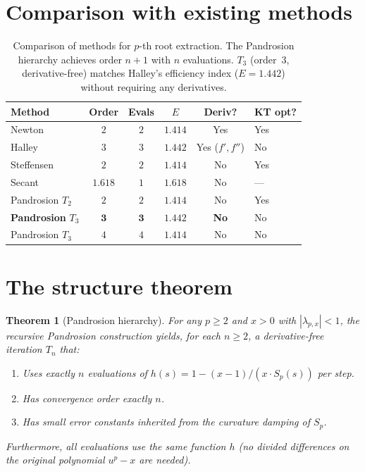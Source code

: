\documentclass[10pt,a4paper,oneside]{book}
\newtheorem{theorem}{Theorem}[chapter]
\theoremstyle{definition}
\theoremstyle{remark}
\begin{document}
\section{Comparison with existing methods}
\label{sec:comparison}

\begin{table}[H]
\centering
\renewcommand{\arraystretch}{1.2}
\begin{tabular}{lccccl}
\toprule
\textbf{Method} & \textbf{Order} & \textbf{Evals} & $E$ & \textbf{Deriv?} & \textbf{KT opt?} \\
\midrule
Newton & $2$ & $2$ & $1.414$ & Yes & Yes \\
Halley & $3$ & $3$ & $1.442$ & Yes ($f',f''$) & No \\
Steffensen & $2$ & $2$ & $1.414$ & No & Yes \\
Secant & $1.618$ & $1$ & $1.618$ & No & --- \\
\midrule
Pandrosion $T_2$ & $2$ & $2$ & $1.414$ & No & Yes \\
\textbf{Pandrosion} $T_3$ & $\mathbf{3}$ & $\mathbf{3}$ & $\mathbf{1.442}$ & \textbf{No} & No \\
Pandrosion $T_3$ & $4$ & $4$ & $1.414$ & No & No \\
\bottomrule
\end{tabular}
\caption{Comparison of methods for $p$-th root extraction.  The Pandrosion hierarchy achieves order $n+1$ with $n$ evaluations.  $T_3$ (order~$3$, derivative-free) matches Halley's efficiency index ($E = 1.442$) without requiring any derivatives.}
\label{tab:comparison}
\end{table}

\section{The structure theorem}
\label{sec:structure}

\begin{theorem}[Pandrosion hierarchy]
\label{thm:hierarchy}
For any $p \geq 2$ and $x > 0$ with $|{\lambda_{p,x}}| < 1$, the recursive Pandrosion construction yields, for each $n \geq 2$, a derivative-free iteration $T_n$ that:
\begin{enumerate}
  \item Uses exactly $n$ evaluations of $h(s) = 1 - (x-1)/(x \cdot S_p(s))$ per step.
  \item Has convergence order exactly $n$.
  \item Has small error constants inherited from the curvature damping of $S_p$.
\end{enumerate}
Furthermore, all evaluations use the same function $h$ (no divided differences on the original polynomial $u^p - x$ are needed).
\end{theorem}
\end{document}
